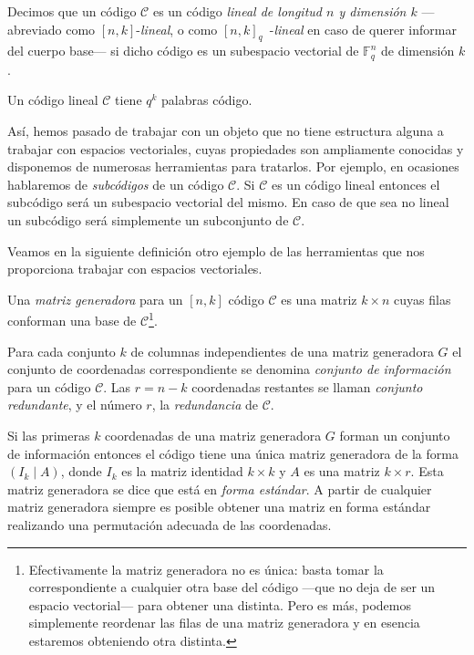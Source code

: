 \begin{definition}
  Decimos que un código \(\mathcal C\) es un código \textit{lineal de longitud \(n\) y dimensión \(k\)} —abreviado como \([n, k]\)-\textit{lineal}, o como \([n, k]_q\)~-\textit{lineal} en caso de querer informar del cuerpo base— si dicho código es un subespacio vectorial de \(\mathbb F_q^n\) de dimensión \(k\).
\end{definition}

\begin{remark}
  Un código lineal \(\mathcal C\) tiene \(q^k\) palabras código.
\end{remark}

Así, hemos pasado de trabajar con un objeto que no tiene estructura alguna a trabajar con espacios vectoriales, cuyas propiedades son ampliamente conocidas y disponemos de numerosas herramientas para tratarlos.
Por ejemplo, en ocasiones hablaremos de \emph{subcódigos} de un código \(\mathcal C\).
Si \(\mathcal C\) es un código lineal entonces el subcódigo será un subespacio vectorial del mismo.
En caso de que sea no lineal un subcódigo será simplemente un subconjunto de \(\mathcal C\).

Veamos en la siguiente definición otro ejemplo de las herramientas que nos proporciona trabajar con espacios vectoriales.

\begin{definition}
  Una \textit{matriz generadora} para un \([n, k]\) código \(\mathcal C\) es una matriz \(k \times n\) cuyas filas conforman una base de \(\mathcal C\)\footnote{Efectivamente la matriz generadora no es única: basta tomar la correspondiente a cualquier otra base del código —que no deja de ser un espacio vectorial— para obtener una distinta. Pero es más, podemos simplemente reordenar las filas de una matriz generadora y en esencia estaremos obteniendo otra distinta.}.
\end{definition}



\begin{definition}
  Para cada conjunto \(k\) de columnas independientes de una matriz generadora \(G\) el conjunto de coordenadas correspondiente se denomina \textit{conjunto de información} para un código \(\mathcal C\). 
  Las \(r = n - k\) coordenadas restantes se llaman \textit{conjunto redundante}, y el número \(r\), la \textit{redundancia} de \(\mathcal C\).
\end{definition}

Si las primeras \(k\) coordenadas de una matriz generadora \(G\) forman un conjunto de información entonces el código tiene una única matriz generadora de la forma \((I_k \mid A)\), donde \(I_k\) es la matriz identidad \(k \times k\) y \(A\) es una matriz \(k \times r\). 
Esta matriz generadora se dice que está en \textit{forma estándar}.
A partir de cualquier matriz generadora siempre es posible obtener una matriz en forma estándar realizando una permutación adecuada de las coordenadas.

